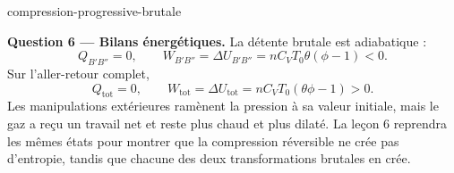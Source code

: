 \begin{exo}{compression-progressive-brutale}
\begin{solution}
\textbf{Question 6 --- Bilans énergétiques.} La détente brutale est
adiabatique :
\[
Q_{B'B''}=0,
\qquad
W_{B'B''}=\Delta U_{B'B''}
=nC_VT_0\theta(\phi-1)<0.
\]
Sur l'aller-retour complet,
\[
Q_{\mathrm{tot}}=0,
\qquad
W_{\mathrm{tot}}=\Delta U_{\mathrm{tot}}
=nC_VT_0(\theta\phi-1)>0.
\]
Les manipulations extérieures ramènent la pression à sa valeur initiale, mais
le gaz a reçu un travail net et reste plus chaud et plus dilaté. La leçon 6
reprendra les mêmes états pour montrer que la compression réversible ne crée
pas d'entropie, tandis que chacune des deux transformations brutales en crée.
\end{solution}
\end{exo}
